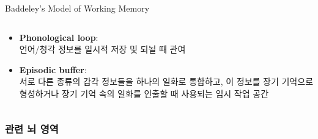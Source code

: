 \documentclass{beamer}
\begin{document}
\begin{frame}{Baddeley's Model of Working Memory}
\begin{columns}
\begin{column}{0.62\textwidth}
\begin{itemize}
        \item \textbf{Phonological loop}: \\언어/청각 정보를 일시적 저장 및 되뇔 때 관여
        \item \textbf{Episodic buffer}: \\서로 다른 종류의 감각 정보들을 하나의 일화로 통합하고, 이 정보를 장기 기억으로 형성하거나 장기 기억 속의 일화를 인출할 때 사용되는 임시 작업 공간
      \end{itemize}
    \end{column}
  \end{columns}
\end{frame}

\subsubsection{관련 뇌 영역}
\end{document}
